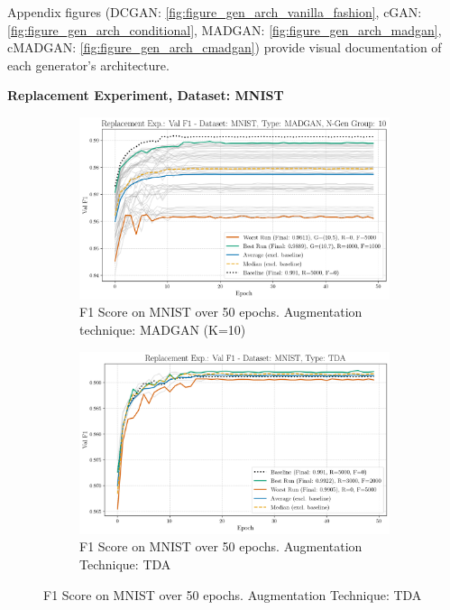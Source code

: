 Appendix figures (DCGAN: \ref{fig:figure_gen_arch_vanilla_fashion}, cGAN: \ref{fig:figure_gen_arch_conditional}, MADGAN: \ref{fig:figure_gen_arch_madgan}, cMADGAN: \ref{fig:figure_gen_arch_cmadgan}) provide visual documentation of each generator’s architecture.


\newpage
 \noindent\textbf{Replacement Experiment, Dataset: MNIST}
\begin{figure}[H]
	\centering
	\begin{subfigure}{.85\textwidth}
		\includegraphics[width=\textwidth]{abb/strat_classifier_performance/MNIST_STRATIFIED_CLASSIFIERS_MADGAN_NEW/replacement_experiments/val_f1_score_MADGAN_MNIST_n_gen_10_all.png}
		\caption{F1 Score on MNIST over 50 epochs. Augmentation technique: MADGAN (K=10)}
        \label{fig:res_replacement_mnist_tda_vs_madgan__madgan}
	\end{subfigure}
	\begin{subfigure}{.85\textwidth}
		\includegraphics[width=\textwidth]{abb/strat_classifier_performance/tda_mnist/replacement_experiments/val_f1_score_tda_mnist_mnist_all.png}
		\caption{F1 Score on MNIST over 50 epochs. Augmentation Technique: TDA}
        \label{fig:res_replacement_mnist_tda_vs_madgan__tda}
	\end{subfigure}
\end{figure}


